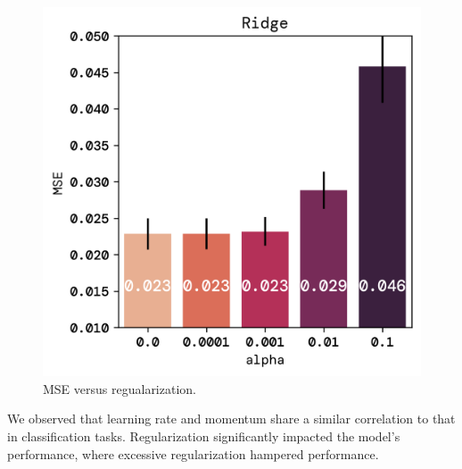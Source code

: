 \documentclass[twoside,11pt]{report}
\begin{document}
\begin{figure}[!ht]
\begin{minipage}[t]{0.5\textwidth - 1mm}
\begin{center}
                \includegraphics[width=\textwidth]{../runsAndFigures/MSE_alpha.png}
            \end{center}
            \caption
            {
                MSE versus regualarization.
            }\label{fig:MSE_aplha}
        \end{minipage}
    \end{figure}

    \noindent
    We observed that learning rate and momentum share a similar correlation to that in classification tasks. 
    Regularization significantly impacted the model's performance, where excessive regularization 
    hampered performance.\\
\end{document}
